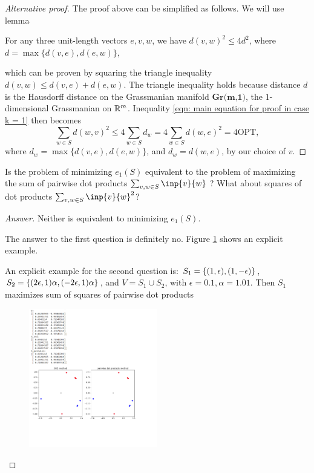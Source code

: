 \documentclass{article}
\begin{document}
\begin{proof}[Alternative proof]
The proof above can be simplified as follows. We will use lemma
\begin{lemma}
For any three unit-length vectors $e,v,w$, we have $d(v,w)^2\leq 4d^2$, where $d = \max\{d(v,e),d(e,w)\}$,
\end{lemma}
which can be proven by squaring the triangle inequality $d(v,w)\leq d(v,e)+d(e,w)$. The triangle inequality holds because distance $d$ is the Hausdorff distance on the Grassmanian manifold $\textbf{Gr(m,1)}$, the $1$-dimensional Grassmanian on $\mathbb{R}^m$. Inequality \ref{eqn: main equation for proof in case k = 1} then becomes 
\begin{equation}
    \sum_{w\in S}d(w,v)^2\leq 4\sum_{w\in S}d_w = 4\sum_{w\in S}d(w,e)^2 = 4\text{OPT},
\end{equation}
where $d_w = \max\{d(v,e),d(e,w)\}$, and $d_w = d(w,e)$, by our choice of $v$.
\end{proof}

\begin{question}
    Is the problem of minimizing $e_1(S)$ equivalent to the problem of maximizing the sum of pairwise dot products $\sum_{v,w\in S}\inp{v}{w}$ ? What about squares of dot products $\sum_{v,w\in S}\inp{v}{w}^2$?
\end{question}

\begin{proof}[Answer]\label{Q: pairwise inner products and rank-1 approximation}
Neither is equivalent to minimizing $e_1(S)$.

The answer to the first question is definitely no. Figure \ref{fig: not equivalent} shows an explicit example. 

An explicit example for the second question is: $S_1 = \left\{(1,\epsilon),(1,-\epsilon)\right\}$, $S_2 = \left\{(2\epsilon, 1)\alpha,(-2\epsilon, 1)\alpha\right\}$, and $V = S_1\cup S_2$, with $\epsilon = 0.1, \alpha = 1.01.$ Then $S_1$ maximizes sum of squares of pairwise dot products
\begin{figure}
 \flushright
 \caption{\label{fig: not equivalent}}
 \includegraphics[width=0.5\textwidth]{images/not_equivalent.png}
\end{figure}
\end{proof}
\end{document}
